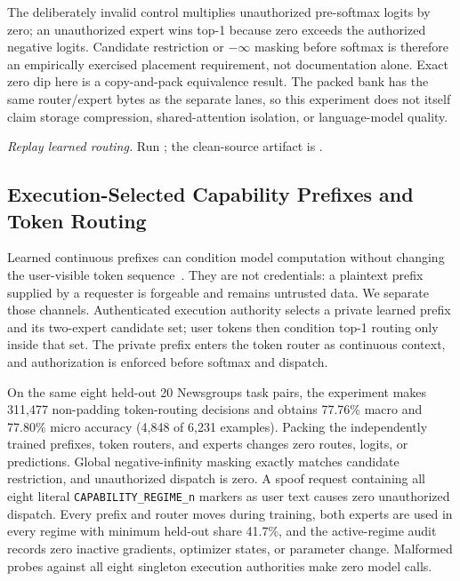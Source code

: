 \documentclass[11pt]{article}
\begin{document}
The deliberately invalid control multiplies unauthorized pre-softmax logits by
zero; an unauthorized expert wins top-1 because zero exceeds the authorized
negative logits. Candidate restriction or $-\infty$ masking before softmax is
therefore an empirically exercised placement requirement, not documentation
alone. Exact zero dip here is a copy-and-pack equivalence result. The packed
bank has the same router/expert bytes as the separate lanes, so this experiment
does not itself claim storage compression, shared-attention isolation, or
language-model quality.

\begin{sloppypar}
\noindent\textit{Replay learned routing.} Run
; the clean-source artifact is
.
\end{sloppypar}

\subsection{Execution-Selected Capability Prefixes and Token Routing}

Learned continuous prefixes can condition model computation without changing
the user-visible token sequence~\citep{li2021prefix}. They are not credentials:
a plaintext prefix supplied by a requester is forgeable and remains untrusted
data. We separate those channels. Authenticated execution authority selects a
private learned prefix and its two-expert candidate set; user tokens then
condition top-1 routing only inside that set. The private prefix enters the
token router as continuous context, and authorization is enforced before
softmax and dispatch.

On the same eight held-out 20 Newsgroups task pairs, the experiment makes
311,477 non-padding token-routing decisions and obtains 77.76\% macro and
77.80\% micro accuracy (4,848 of 6,231 examples). Packing the independently
trained prefixes, token routers, and experts changes zero routes, logits, or
predictions. Global negative-infinity masking exactly matches candidate
restriction, and unauthorized dispatch is zero. A spoof request containing all
eight literal \texttt{CAPABILITY\_REGIME\_n} markers as user text causes zero
unauthorized dispatch. Every prefix and router moves during training, both
experts are used in every regime with minimum held-out share 41.7\%, and the
active-regime audit records zero inactive gradients, optimizer states, or
parameter change. Malformed probes against all eight singleton execution
authorities make zero model calls.
\end{document}
